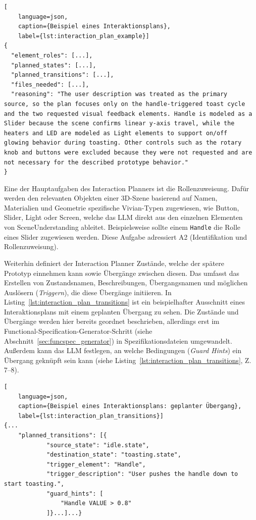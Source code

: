 \begin{lstlisting}[
	language=json,
	caption={Beispiel eines Interaktionsplans},
	label={lst:interaction_plan_example}]
{
  "element_roles": [...],
  "planned_states": [...],
  "planned_transitions": [...],
  "files_needed": [...],
  "reasoning": "The user description was treated as the primary source, so the plan focuses only on the handle-triggered toast cycle and the two requested visual feedback elements. Handle is modeled as a Slider because the scene confirms linear y-axis travel, while the heaters and LED are modeled as Light elements to support on/off glowing behavior during toasting. Other controls such as the rotary knob and buttons were excluded because they were not requested and are not necessary for the described prototype behavior."
}
\end{lstlisting}

Eine der Hauptaufgaben des Interaction Planners ist die Rollenzuweisung.
Dafür werden den relevanten Objekten einer 3D-Szene basierend auf Namen, Materialien und Geometrie spezifische Vivian-Typen zugewiesen, wie Button, Slider, Light oder Screen, welche das LLM direkt aus den einzelnen Elementen von SceneUnderstanding ableitet.
Beispielsweise sollte einem \texttt{Handle} die Rolle eines Slider zugewiesen werden.
Diese Aufgabe adressiert A2 (Identifikation und Rollenzuweisung).

Weiterhin definiert der Interaction Planner Zustände, welche der spätere Prototyp einnehmen kann sowie Übergänge zwischen diesen.
Das umfasst das Erstellen von Zustandsnamen, Beschreibungen, Übergangsnamen und möglichen Auslösern (\textit{Triggern}), die diese Übergänge initiieren.
In Listing~\ref{lst:interaction_plan_transitions} ist ein beispielhafter Ausschnitt eines Interaktionsplans mit einem geplanten Übergang zu sehen.
Die Zustände und Übergänge werden hier bereits geordnet beschrieben, allerdings erst im Functional-Specification-Generator-Schritt (siehe Abschnitt~\ref{sec:funcspec_generator}) in Spezifikationsdateien umgewandelt.
Außerdem kann das LLM festlegen, an welche Bedingungen (\textit{Guard Hints}) ein Übergang geknüpft sein kann (siehe Listing~\ref{lst:interaction_plan_transitions}, Z. 7--8).

\begin{lstlisting}[
	language=json,
	caption={Beispiel eines Interaktionsplans: geplanter Übergang},
	label={lst:interaction_plan_transitions}]
{...
	"planned_transitions": [{
			"source_state": "idle.state",
			"destination_state": "toasting.state",
			"trigger_element": "Handle",
			"trigger_description": "User pushes the handle down to start toasting.",
			"guard_hints": [
				"Handle VALUE > 0.8"
			]}...]...}
\end{lstlisting}

